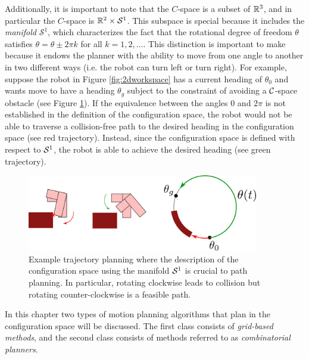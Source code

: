 \begin{example}
Additionally, it is important to note that the $C$-space is a subset of $\mathbb{R}^3$, and in particular the $C$-space is $\mathbb{R}^2 \times \mathcal{S}^1$. This subspace is special because it includes the \textit{manifold} $\mathcal{S}^1$, which characterizes the fact that the rotational degree of freedom $\theta$ satisfies $\theta = \theta \pm 2\pi k$ for all $k = 1,2,\dots$. This distinction is important to make because it endows the planner with the ability to move from one angle to another in two different ways (i.e. the robot can turn left or turn right). For example, suppose the robot in Figure \ref{fig:2dworkspace} has a current heading of $\theta_0$ and wants move to have a heading $\theta_g$ subject to the constraint of avoiding a $\mathcal{C}$-space obstacle (see Figure \ref{fig:rotational-dof-fig}). If the equivalence between the angles 0 and $2\pi$ is not established in the definition of the configuration space, the robot would not be able to traverse a collision-free path to the desired heading in the configuration space (see red trajectory). Instead, since the configuration space is defined with respect to $\mathcal{S}^1$, the robot is able to achieve the desired heading (see green trajectory).

\begin{figure}[h]
\begin{center}
\includegraphics[width=0.9\textwidth]{tex/figs/ch05_figs/S1_obstacle.png}
\caption{Example trajectory planning where the description of the configuration space using the manifold $\mathcal{S}^1$ is crucial to path planning. In particular, rotating clockwise leads to collision but rotating counter-clockwise is a feasible path.}
\label{fig:rotational-dof-fig}
\end{center}
\end{figure}

\end{example}

In this chapter two types of motion planning algorithms that plan in the configuration space will be discussed. The first class consists of \textit{grid-based methods}, and the second class consists of methods referred to as \textit{combinatorial planners}.


